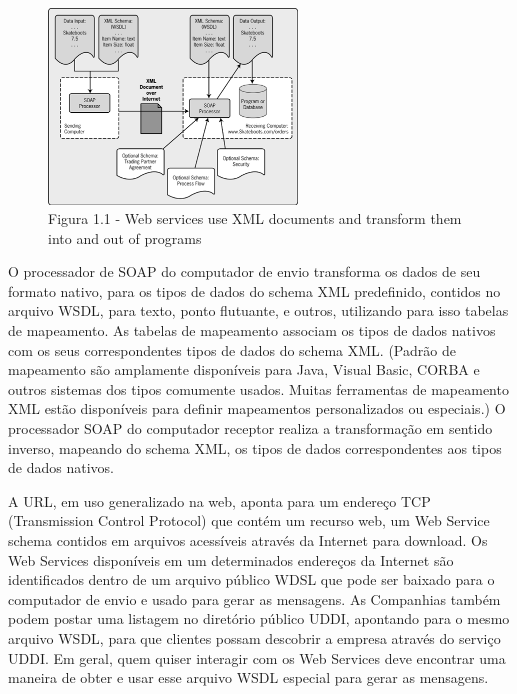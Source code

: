\documentclass{acm_proc_article-sp}
\begin{document}
			\begin{figure}[h]
				\begin{center}
					\includegraphics[width=250px]{WebServiceFuncionamento}
						\caption{Figura 1.1 - Web services use XML documents and transform them into and out of programs}
					\label{fig:WebServiceFuncionamento}
				\end{center}
			\end{figure}
		
			O processador de SOAP do computador de envio transforma os dados de seu formato nativo, para os tipos de dados do schema XML predefinido, contidos no arquivo WSDL, para texto, ponto flutuante, e outros, utilizando para isso tabelas de mapeamento. As tabelas de mapeamento associam os tipos de dados nativos com os seus correspondentes tipos de dados do schema XML. (Padrão de mapeamento são amplamente disponíveis para Java, Visual Basic, CORBA e outros sistemas dos tipos comumente usados. Muitas ferramentas de mapeamento XML estão disponíveis para definir mapeamentos personalizados ou especiais.) O processador SOAP do computador receptor realiza a transformação em sentido inverso, mapeando do schema XML, os tipos de dados correspondentes aos tipos de dados nativos.
		
			A URL, em uso generalizado na web, aponta para um endereço TCP (Transmission Control Protocol) que contém um recurso web, um Web Service schema contidos em arquivos acessíveis através da Internet  para download. Os Web Services disponíveis em um determinados endereços da Internet são identificados dentro de um arquivo público WDSL que pode ser baixado para o computador de envio e usado para gerar as mensagens. As Companhias também podem postar uma listagem no diretório público UDDI, apontando para o mesmo arquivo WSDL, para que clientes possam descobrir a empresa através do serviço UDDI. Em geral, quem quiser interagir com os Web Services deve encontrar uma maneira de obter e usar esse arquivo WSDL especial para gerar as mensagens.
		
\end{document}
